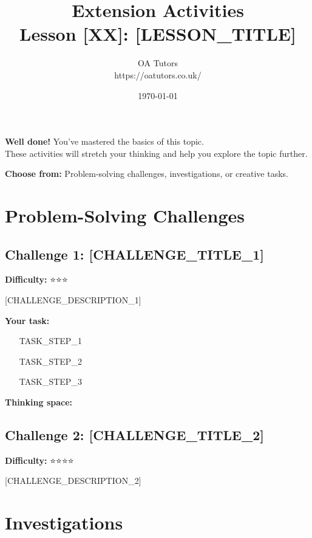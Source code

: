 \documentclass[a4paper,12pt]{article}
\begin{document}
\title{\textcolor{oagreen}{\Huge Extension Activities} \\ 
       \textcolor{oablue}{\Large Lesson [XX]: [LESSON_TITLE]}}
\author{\textcolor{oablue}{OA Tutors} \\ 
        \textcolor{oagray}{https://oatutors.co.uk/}}
\date{\textcolor{oagray}{\today}}

\maketitle

\begin{challenge}
\textbf{Well done!} You've mastered the basics of this topic. \\
These activities will stretch your thinking and help you explore the topic further.

\textbf{Choose from:} Problem-solving challenges, investigations, or creative tasks.
\end{challenge}

\section{Problem-Solving Challenges}

\subsection{Challenge 1: [CHALLENGE_TITLE_1]}
\textbf{Difficulty:} ⭐⭐⭐

[CHALLENGE_DESCRIPTION_1]

\textbf{Your task:}
\begin{enumerate}
    \item [TASK_STEP_1]
    \item [TASK_STEP_2]
    \item [TASK_STEP_3]
\end{enumerate}

\textbf{Thinking space:}

\vspace{4cm}

\subsection{Challenge 2: [CHALLENGE_TITLE_2]}
\textbf{Difficulty:} ⭐⭐⭐⭐

[CHALLENGE_DESCRIPTION_2]

\vspace{4cm}

\section{Investigations}
\end{document}

